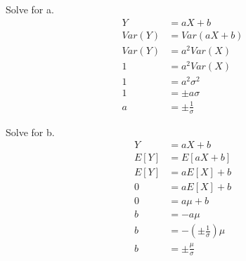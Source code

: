 \section{}

Solve for a.
\begin{align*}
    Y &= a X + b \\
    Var(Y) &= Var(a X + b) \\
    Var(Y) &= a^2 Var(X) \\
    1 &= a^2 Var(X) \\
    1 &= a^2 \sigma^2 \\
    1 &= \pm a \sigma \\ 
    a &= \pm \frac{1}{\sigma} 
\end{align*}

Solve for b.
\begin{align*}
    Y &= aX + b \\
    E[Y] &= E[aX + b] \\
    E[Y] &= a E[X] + b \\
    0 &= a E[X] + b \\
    0 &= a \mu + b \\
    b &= -a \mu \\
    b &= - (\pm \frac{1}{\sigma}) \mu \\
    b &= \pm \frac{\mu}{\sigma}
\end{align*}

